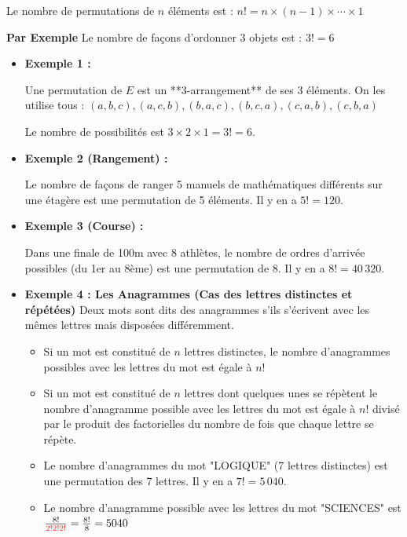 \documentclass[12pt,a4paper]{article}
\begin{document}
\begin{enumerate}[label=\Roman*., font=\bfseries\color{red}]
\begin{enumerate}
\begin{enumerate}
\begin{itemize}
    Le nombre de permutations de \( n \) éléments est :
    \(
    n! = n \times (n-1) \times \cdots \times 1
    \)
    
\textbf{Par Exemple}
Le nombre de façons d’ordonner 3 objets est :
    \(
    3! = 6
    \)
\begin{itemize}
    \item \textbf{Exemple 1 :} 
    
		Une permutation de $E$ est un **3-arrangement** de ses 3 éléments. On les utilise tous :
    \( (a,b,c), (a,c,b), (b,a,c), (b,c,a), (c,a,b), (c,b,a) \)
    
    Le nombre de possibilités est $3 \times 2 \times 1 = 3! = 6$.
    
    \item \textbf{Exemple 2 (Rangement) :} 
    
    Le nombre de façons de ranger 5 manuels de mathématiques différents sur une étagère est une permutation de 5 éléments. Il y en a $5! = 120$.
    
    \item \textbf{Exemple 3 (Course) :} 
    
    Dans une finale de 100m avec 8 athlètes, le nombre de ordres d'arrivée possibles (du 1er au 8ème) est une permutation de 8. Il y en a $8! = 40\,320$.
    
    \item \textbf{Exemple 4 : Les Anagrammes (Cas des lettres distinctes et répétées)} 
                Deux mots sont dits des anagrammes s'ils s'écrivent avec les mêmes lettres mais disposées différemment.
                
\begin{itemize}
    \item Si un mot est constitué de $n$ lettres distinctes, le nombre d'anagrammes possibles avec les lettres du mot est égale à {\color{red}$n!$}
    \item Si un mot est constitué de $n$ lettres dont quelques unes se répètent le nombre d'anagramme possible avec les lettres du mot est égale à {\color{red}$n!$} divisé par le produit des factorielles du nombre de fois que chaque lettre se répète.
\end{itemize} 

    \begin{itemize}
    \item Le nombre d'anagrammes du mot "LOGIQUE" (7 lettres distinctes) est une permutation des 7 lettres. Il y en a $7! = 5\,040$.

    \item Le nombre d'anagramme possible avec les lettres du mot "SCIENCES" est $ \frac{8!}{{\color{red}2!2!2!}} = \frac{8!}{8} = 5040$


\end{itemize}
\end{itemize}
\end{itemize}
\end{enumerate}
\end{enumerate}
\end{enumerate}
\end{document}
